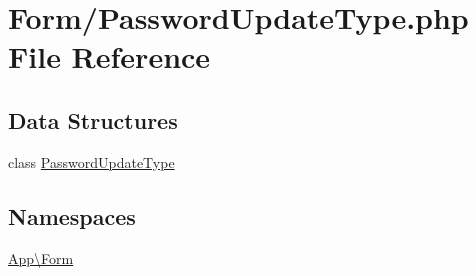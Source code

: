 \hypertarget{_password_update_type_8php}{}\section{Form/\+Password\+Update\+Type.php File Reference}
\label{_password_update_type_8php}
\subsection*{Data Structures}
\begin{DoxyCompactItemize}
\item 
class \mbox{\hyperlink{class_app_1_1_form_1_1_password_update_type}{Password\+Update\+Type}}
\end{DoxyCompactItemize}
\subsection*{Namespaces}
\begin{DoxyCompactItemize}
\item 
 \mbox{\hyperlink{namespace_app_1_1_form}{App\textbackslash{}\+Form}}
\end{DoxyCompactItemize}
